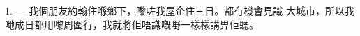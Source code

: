 %
%
%
%
%
%
%
%
%
%
%

\VUsaut{4.0mm}
\VUsaut{3.0mm}

\VUsaut{3.0mm}

1. --- 我個朋友約翰住喺鄉下，嚟咗我屋企住三日。都冇機會見識
大城市，所以我哋成日都用嚟周圍行，我就將佢唔識嘅嘢一樣樣講畀佢聽。

